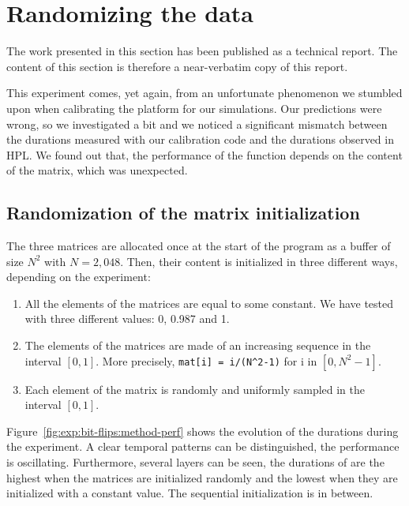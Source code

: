     \section{Randomizing the data}%
    \label{sec:randomizing_data}
        The work presented in this section has been published as a technical report\cite{cornebize:bitflips}. The
        content of this section is therefore a near-verbatim copy of this report.

        This experiment comes, yet again, from an unfortunate phenomenon we stumbled upon when calibrating the platform
        for our simulations. Our predictions were wrong, so we investigated a bit and we noticed a significant mismatch
        between the durations measured with our calibration code and the durations observed in HPL. We found out that,
        the performance of the \dgemm function depends on the content of the matrix, which was unexpected.

        \subsection{Randomization of the matrix initialization}
        \label{sub:randomization_matrix_initialization}
            The three matrices are allocated once at the start of the program as a buffer of size \(N^2\) with
            \(N=2,048\). Then, their content is initialized in three different ways, depending on the experiment:
            \begin{enumerate}
                \item All the elements of the matrices are equal to some constant. We have tested with three different
                    values: 0, 0.987 and 1.
                \item The elements of the matrices are made of an increasing sequence in the interval \([0, 1]\). More
                    precisely, \texttt{mat[i] = i/(N\textasciicircum{}2-1)} for i in \([0, N^2-1]\).
                \item Each element of the matrix is randomly and uniformly sampled in the interval \([0, 1]\).
            \end{enumerate}

        Figure~\ref{fig:exp:bit-flips:method-perf} shows the evolution of the \dgemm durations during the experiment.
        A clear temporal patterns can be distinguished, the performance is oscillating.  Furthermore, several layers can
        be seen, the durations of \dgemm are the highest when the matrices are initialized randomly and the
        lowest when they are initialized with a constant value. The sequential initialization is in between.

